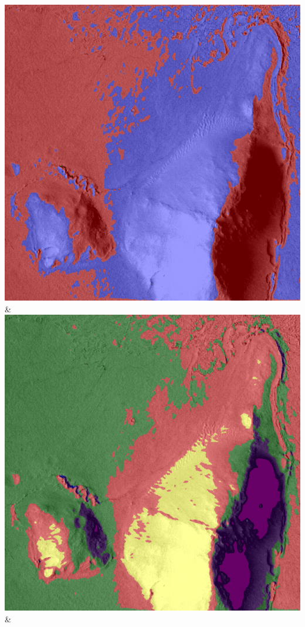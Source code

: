 \begin{table}[h!]
\begin{tabularx}{\textwidth}
		\includegraphics[width=0.9\linewidth]{images/gen/activation_functions/p03_04.png_None.png} &
		\includegraphics[width=0.9\linewidth]{images/gen/activation_functions/p03_04.png_relu.png} &

\end{tabularx}
\end{table}
